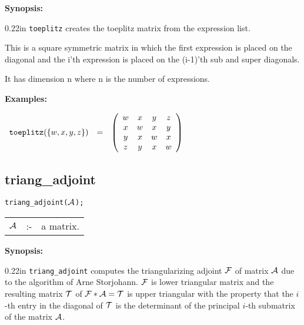 {\bf Synopsis:} %

\begin{addtolength}{\leftskip}{0.22in}
{\tt toeplitz} creates the toeplitz matrix from the 
                expression list. 

This is a square symmetric matrix in 
                which the first expression is placed on the diagonal 
                and the i'th expression is placed on the (i-1)'th sub 
                and super diagonals.

It has dimension n where n is the 
                number of expressions.

\end{addtolength}

{\bf Examples:}

\begin{flushleft}  
\hspace*{0.1in}
\begin{math}  
\begin{array}{ccc}
{\tt toeplitz}(\{w,x,y,z\}) & = & 
        \left( \begin{array}{cccc} w & x & y & z \\ x & w & x & y \\
      y & x & w & x \\ z & y & x & w
 \end{array} \right) 
\end{array}
\end{math}  
\end{flushleft}

\subsection{triang\_adjoint}

\hspace*{0.175in} {\tt triang\_adjoint(${\cal A}$);}

\hspace*{0.1in}
\begin{tabular}{l l l}
${\cal A}$  &:-& a matrix.
\end{tabular}

{\bf Synopsis:} %


\begin{addtolength}{\leftskip}{0.22in}
{\tt triang\_adjoint} computes the triangularizing adjoint ${\cal F}$ of
matrix ${\cal A}$ due to the algorithm of Arne Storjohann. ${\cal F}$ is
lower triangular matrix and the resulting matrix ${\cal T}$ of
${\cal F * A = T}$ is upper triangular with the property that the $i$-th
entry in the diagonal of ${\cal T}$ is the determinant of the principal
$i$-th submatrix of the matrix ${\cal A}$.

\end{addtolength}

